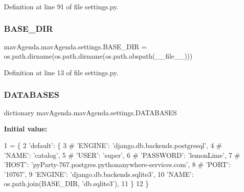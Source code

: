 Definition at line 91 of file settings.\+py.

\mbox{\label{namespacemavAgenda_1_1mavAgenda_1_1settings_ac2a1051d132263e80427d9680d0c7e6c}} 
\subsubsection{\texorpdfstring{B\+A\+S\+E\+\_\+\+D\+IR}{BASE\_DIR}}
{\footnotesize\ttfamily mav\+Agenda.\+mav\+Agenda.\+settings.\+B\+A\+S\+E\+\_\+\+D\+IR = os.\+path.\+dirname(os.\+path.\+dirname(os.\+path.\+abspath(\+\_\+\+\_\+file\+\_\+\+\_\+)))}



Definition at line 13 of file settings.\+py.

\mbox{\label{namespacemavAgenda_1_1mavAgenda_1_1settings_a7523f638d8f5aa5b8938f2100fe672b0}} 
\subsubsection{\texorpdfstring{D\+A\+T\+A\+B\+A\+S\+ES}{DATABASES}}
{\footnotesize\ttfamily dictionary mav\+Agenda.\+mav\+Agenda.\+settings.\+D\+A\+T\+A\+B\+A\+S\+ES}

{\bfseries Initial value\+:}
\begin{DoxyCode}
1 =  \{
2     \textcolor{stringliteral}{'default'}: \{
3      \textcolor{comment}{#   'ENGINE': 'django.db.backends.postgresql',}
4      \textcolor{comment}{#   'NAME': 'catalog',}
5      \textcolor{comment}{#   'USER': 'super',}
6      \textcolor{comment}{#   'PASSWORD': 'lemonLime',}
7      \textcolor{comment}{#   'HOST': 'pyParty-767.postgres.pythonanywhere-services.com',}
8      \textcolor{comment}{#   'PORT': '10767',}
9         \textcolor{stringliteral}{'ENGINE'}: \textcolor{stringliteral}{'django.db.backends.sqlite3'},
10         \textcolor{stringliteral}{'NAME'}: os.path.join(BASE\_DIR, \textcolor{stringliteral}{'db.sqlite3'}),
11     \}
12 \}
\end{DoxyCode}


